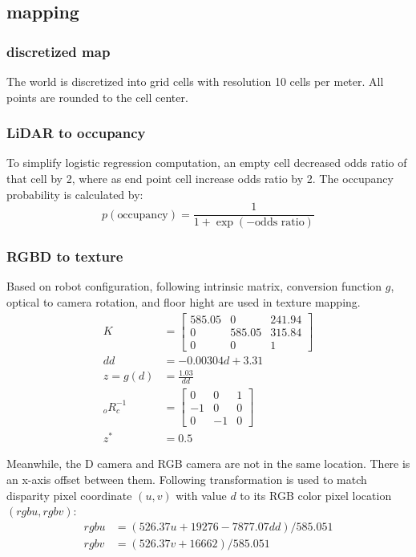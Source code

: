 \documentclass[conference]{IEEEtran}
\begin{document}
\subsection{mapping}
\subsubsection{discretized map}
The world is discretized into grid cells with resolution 10 cells per meter.
All points are rounded to the cell center.

\subsubsection{LiDAR to occupancy}
To simplify logistic regression computation,
an empty cell decreased odds ratio of that cell by 2, where as end point cell
increase odds ratio by 2. The occupancy probability is calculated by:
$$
p\left(\text{occupancy}\right) = \frac{1}{1 + \exp\left(- \text{odds ratio}\right)}
$$

\subsubsection{RGBD to texture}
Based on robot configuration,
following intrinsic matrix, conversion function $g$, optical to camera rotation, and floor hight are used in texture mapping.
$$
\begin{aligned}
K&=\left[ \begin{matrix}585.05&0&241.94\\ 0&585.05&315.84\\ 0&0&1\end{matrix} \right] \\ 
dd&=-0.00304d+3.31 \\ 
z = g(d) &= \frac{1.03}{dd} \\
{}_oR_c^{-1} &= \left[ \begin{matrix}0&0&1\\ -1&0&0\\ 0&-1&0\end{matrix} \right] \\
z^* & = 0.5
\end{aligned}
$$

Meanwhile, the D camera and RGB camera are not in the same location. 
There is an x-axis offset between them.
Following transformation is used to match 
disparity pixel coordinate $(u, v)$ with value $d$
to its RGB color pixel location $(rgbu, rgbv)$:
$$
\begin{aligned}
    rgbu&=\left( 526.37u+19276-7877.07dd\right)  /585.051\\ 
    rgbv&=\left( 526.37v+16662\right)  /585.051
\end{aligned} 
$$
\end{document}
